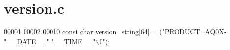 \hypertarget{a00075_source}{\section{version.\+c}
\label{a00075_source}
}

\begin{DoxyCode}
00001 
00002 
\hypertarget{a00075_source_l00010}{}\hyperlink{a00075_a9913e6dccd88bd052d3e8e9d73da4ede}{00010} \textcolor{keyword}{const} \textcolor{keywordtype}{char} \hyperlink{a00075_a9913e6dccd88bd052d3e8e9d73da4ede}{version\_string}[64] = (\textcolor{stringliteral}{"PRODUCT=AQ0X-"}\_\_DATE\_\_\textcolor{stringliteral}{" "}\_\_TIME\_\_\textcolor{stringliteral}{"\(\backslash\)0"});
\end{DoxyCode}

